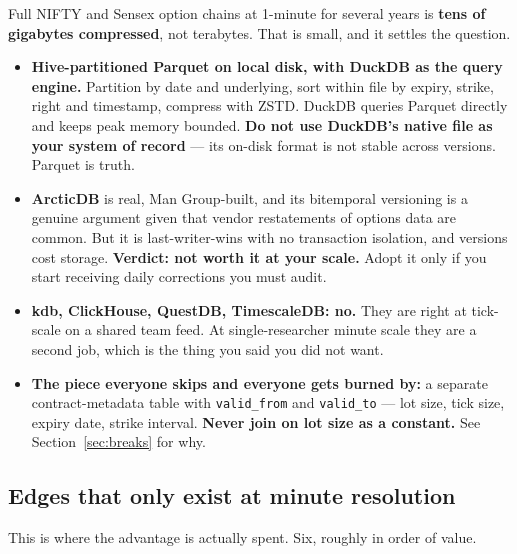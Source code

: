 \documentclass[11pt,a4paper]{article}
\begin{document}
Full NIFTY and Sensex option chains at 1-minute for several years is \textbf{tens
of gigabytes compressed}, not terabytes. That is small, and it settles the question.

\begin{itemize}
\item \textbf{Hive-partitioned Parquet on local disk, with DuckDB as the query
engine.} Partition by date and underlying, sort within file by expiry, strike,
right and timestamp, compress with ZSTD. DuckDB queries Parquet directly and keeps
peak memory bounded. \textbf{Do not use DuckDB's native file as your system of
record} --- its on-disk format is not stable across versions. Parquet is truth.
\item \textbf{ArcticDB} is real, Man Group-built, and its bitemporal versioning is
a genuine argument given that vendor restatements of options data are common. But
it is last-writer-wins with no transaction isolation, and versions cost storage.
\textbf{Verdict: not worth it at your scale.} Adopt it only if you start receiving
daily corrections you must audit.
\item \textbf{kdb, ClickHouse, QuestDB, TimescaleDB: no.} They are right at
tick-scale on a shared team feed. At single-researcher minute scale they are a
second job, which is the thing you said you did not want.
\item \textbf{The piece everyone skips and everyone gets burned by:} a separate
contract-metadata table with \texttt{valid\_from} and \texttt{valid\_to} --- lot
size, tick size, expiry date, strike interval. \textbf{Never join on lot size as a
constant.} See Section~\ref{sec:breaks} for why.
\end{itemize}

\subsection{Edges that only exist at minute resolution}

This is where the advantage is actually spent. Six, roughly in order of value.
\end{document}
